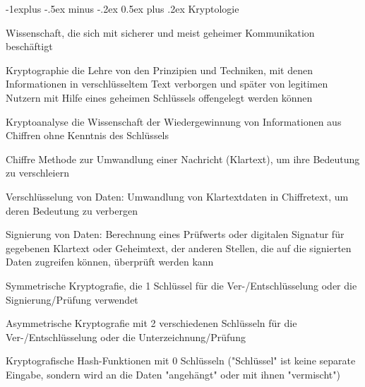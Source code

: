\documentclass[a4paper]{article}
\makeatletter
\renewcommand{\subsection}{\@startsection{subsection}{2}{0mm}%
 {-1explus -.5ex minus -.2ex}%
 {0.5ex plus .2ex}%
 {\normalfont\normalsize\bfseries}}
\makeatother
\begin{document}
\begin{multicols}{3}
      \subsection{Kryptologie}
      \begin{description*}
                  \item Wissenschaft, die sich mit sicherer und meist geheimer Kommunikation beschäftigt
                  \item[Kryptographie] die Lehre von den Prinzipien und Techniken, mit denen Informationen in verschlüsseltem Text verborgen und später von legitimen Nutzern mit Hilfe eines geheimen Schlüssels offengelegt werden können 
                  \item[Kryptoanalyse] die Wissenschaft der Wiedergewinnung von Informationen aus Chiffren ohne Kenntnis des Schlüssels 
            \item[Chiffre] Methode zur Umwandlung einer Nachricht (Klartext), um ihre Bedeutung zu verschleiern
                  \item[Verschlüsselung] von Daten: Umwandlung von Klartextdaten in Chiffretext, um deren Bedeutung zu verbergen
                  \item[Signierung] von Daten: Berechnung eines Prüfwerts oder digitalen Signatur für gegebenen Klartext oder Geheimtext, der anderen Stellen, die auf die signierten Daten zugreifen können, überprüft werden kann
                  \item[Symmetrische] Kryptografie, die 1 Schlüssel für die Ver-/Entschlüsselung oder die Signierung/Prüfung verwendet
                  \item[Asymmetrische] Kryptografie mit 2 verschiedenen Schlüsseln für die Ver-/Entschlüsselung oder die Unterzeichnung/Prüfung
                  \item[Kryptografische Hash-Funktionen] mit 0 Schlüsseln ("Schlüssel" ist keine separate Eingabe, sondern wird an die Daten "angehängt" oder mit ihnen "vermischt")
      \end{description*}


\end{multicols}
\end{document}
